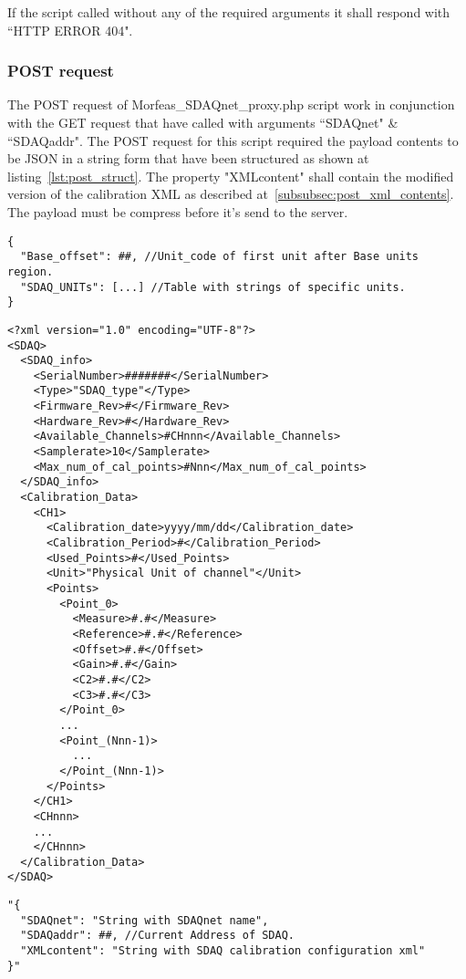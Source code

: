 If the script called without any of the required arguments it shall respond with ``HTTP ERROR 404".

\subsubsection{POST request}
The POST request of Morfeas\_SDAQnet\_proxy.php script work in conjunction with the GET request that have called with arguments ``SDAQnet" \& ``SDAQaddr".
The POST request for this script required the payload contents to be JSON in a string form that have been structured as shown at listing~\ref{lst:post_struct}.
The property "XMLcontent" shall contain the modified version of the calibration XML as described at~\ref{subsubsec:post_xml_contents}.
The payload must be compress before it's send to the server.
\newpage
\begin{lstlisting}[frame=single,caption=Return of call with argument ``UNITs",label=lst:SDAQ_units]
{
  "Base_offset": ##, //Unit_code of first unit after Base units region.
  "SDAQ_UNITs": [...] //Table with strings of specific units.
}
\end{lstlisting}
\begin{lstlisting}[frame=single,caption=Return of call with arguments ``SDAQnet"\&``SDAQaddr",label=lst:SDAQ_calib_info]
<?xml version="1.0" encoding="UTF-8"?>
<SDAQ>
  <SDAQ_info>
    <SerialNumber>#######</SerialNumber>
    <Type>"SDAQ_type"</Type>
    <Firmware_Rev>#</Firmware_Rev>
    <Hardware_Rev>#</Hardware_Rev>
    <Available_Channels>#CHnnn</Available_Channels>
    <Samplerate>10</Samplerate>
    <Max_num_of_cal_points>#Nnn</Max_num_of_cal_points>
  </SDAQ_info>
  <Calibration_Data>
    <CH1>
      <Calibration_date>yyyy/mm/dd</Calibration_date>
      <Calibration_Period>#</Calibration_Period>
      <Used_Points>#</Used_Points>
      <Unit>"Physical Unit of channel"</Unit>
      <Points>
        <Point_0>
          <Measure>#.#</Measure>
          <Reference>#.#</Reference>
          <Offset>#.#</Offset>
          <Gain>#.#</Gain>
          <C2>#.#</C2>
          <C3>#.#</C3>
        </Point_0>
        ...
        <Point_(Nnn-1)>
          ...
        </Point_(Nnn-1)>
      </Points>
    </CH1>
    <CHnnn>
    ...
    </CHnnn>
  </Calibration_Data>
</SDAQ>
\end{lstlisting}
\begin{lstlisting}[frame=single,caption=Structure of Data for Post request",label=lst:post_struct]
"{
  "SDAQnet": "String with SDAQnet name",
  "SDAQaddr": ##, //Current Address of SDAQ.
  "XMLcontent": "String with SDAQ calibration configuration xml"
}"
\end{lstlisting}
\newpage
